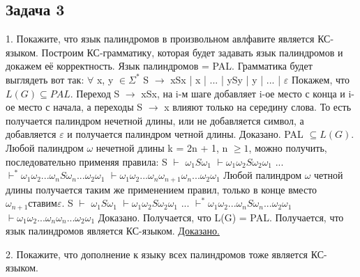 \documentclass[a4paper,14pt]{article} %
\begin{document}
\subsection{Задача 3}
1. Покажите, что язык палиндромов в произвольном авлфавите является КС-языком.
Построим КС-грамматику, которая будет задавать язык палиндромов и докажем её корректность. Язык палиндромов = PAL.
\newline
Грамматика будет выглядеть вот так:
$\forall$ x, y $\in \Sigma^*$
S $\longrightarrow$ xSx | x | ... | ySy | y | ... | $\varepsilon$
Покажем, что $L(G) \subseteq PAL$.
\newline
Переход S $\longrightarrow$ xSx, на i-м шаге добавляет i-ое место с конца и i-ое место с начала, а переходы S $\longrightarrow$ x влияют только на середину слова.
То есть получается палиндром нечетной длины, или не добавляется символ, а добавляется $\varepsilon$ и получается палиндром четной длины. Доказано.
\newline
PAL $\subseteq L(G)$.
Любой палиндром $\omega$ нечетной длины k = 2n + 1, n $\geq 1$, можно получить, последовательно применяя правила: S $\vdash$ $ \omega_1 S \omega_1$ $\vdash \omega_1 \omega_2 S \omega_2 \omega_1$ ... $\vdash^* \omega_1 \omega_2... \omega_n S \omega_n ... \omega_2 \omega_1$ $\vdash \omega_1 \omega_2... \omega_n \omega_{n+1} \omega_n ... \omega_2 \omega_1$
\newline
Любой палиндром $\omega$ четной длины получается таким же применением правил, только в конце вместо $\omega_{n+1} ставим \varepsilon$.
S $\vdash$ $ \omega_1 S \omega_1$ $\vdash \omega_1 \omega_2 S \omega_2 \omega_1$ ... $\vdash^* \omega_1 \omega_2... \omega_n S \omega_n ... \omega_2 \omega_1$ $\vdash \omega_1 \omega_2... \omega_n \omega_n ... \omega_2 \omega_1$
Доказано.
\newline 
Получается, что L(G) = PAL. 
Получается, что язык палиндромов является КС-языком.
\newline
\underline{Доказано.}

2. Покажите, что дополнение к языку всех палиндромов тоже является КС-языком.
\end{document}
